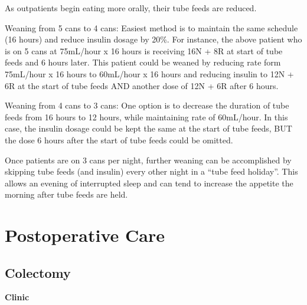 \documentclass[
]{book}
\begin{document}
As outpatients begin eating more orally, their tube feeds are reduced.

Weaning from 5 cans to 4 cans: Easiest method is to maintain the same schedule (16 hours) and reduce insulin dosage by 20\%. For instance, the above patient who is on 5 cans at 75mL/hour x 16 hours is receiving 16N + 8R at start of tube feeds and 6 hours later. This patient could be weaned by reducing rate form 75mL/hour x 16 hours to 60mL/hour x 16 hours and reducing insulin to 12N + 6R at the start of tube feeds AND another dose of 12N + 6R after 6 hours.

Weaning from 4 cans to 3 cans: One option is to decrease the duration of tube feeds from 16 hours to 12 hours, while maintaining rate of 60mL/hour. In this case, the insulin dosage could be kept the same at the start of tube feeds, BUT the dose 6 hours after the start of tube feeds could be omitted.

Once patients are on 3 cans per night, further weaning can be accomplished by skipping tube feeds (and insulin) every other night in a ``tube feed holiday''. This allows an evening of interrupted sleep and can tend to increase the appetite the morning after tube feeds are held.

\hypertarget{part-postoperative-care}{%
\part*{Postoperative Care}\label{part-postoperative-care}}

\hypertarget{colectomy}{%
\chapter{Colectomy}\label{colectomy}}

\textbf{Clinic}
\end{document}
